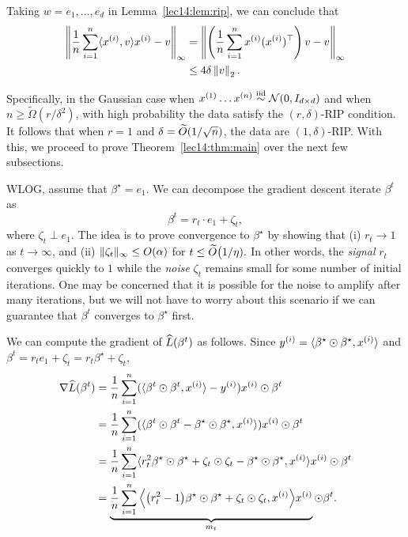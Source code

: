 \begin{corollary}\label{lec14:cor:rip}
    Taking $w = e_1, \dots, e_d$ in Lemma~\ref{lec14:lem:rip}, we can conclude that
    \begin{align}
        \Norm{ \frac{1}{n} \sum_{i=1}^n \langle x^{(i)}, v\rangle x^{(i)} - v }_\infty &= \Norm{ \l(\frac{1}{n} \sum_{i=1}^n x^{(i)}(x^{(i)})^\top \r)v - v }_\infty \\
        &\leq 4\delta \Norm{v}_2.
    \end{align}
\end{corollary}

Specifically, in the Gaussian case when $x^{(1)} \ldots x^{(n)} \iid \mathcal{N}(0, I_{d\times d})$ and when $n\geq \widetilde{\Omega}(r/\delta^2)$, with high probability the data satisfy the $(r, \delta)$-RIP condition. It follows that when $r=1$ and $\delta = \tilO(1/\sqrt{n})$, the data are $(1, \delta)$-RIP. With this, we proceed to prove Theorem~\ref{lec14:thm:main} over the next few subsections.


WLOG, assume that $\beta^\star = e_{1}.$ We can decompose the gradient descent iterate $\beta^{t}$ as
\begin{equation}
    \beta^{t} = r_{t} \cdot e_{1} + \zeta_{t},
\end{equation}
where $\zeta_t \perp e_1$. The idea is to prove convergence to $\beta^\star$ by showing that (i) $r_{t} \rightarrow 1$ as $t \rightarrow \infty$, and (ii) $\norm{\zeta_{t}}_{\infty} \leq O(\alpha)$ for $t \leq \tilO\big(1/\eta).$ In other words, the \textit{signal} $r_{t}$ converges quickly to $1$ while the \textit{noise} $\zeta_t$ remains small for some number of initial iterations. One may be concerned that it is possible for the noise to amplify after many iterations, but we will not have to worry about this scenario if we can guarantee that $\beta^{t}$ converges to $\beta^\star$ first.

We can compute the gradient of $\empLt$ as follows. Since $y\sp{i} = \langle \beta^\star \odot \beta^\star, x\sp{i} \rangle$ and $\beta^{t} = r_{t}e_{1} + \zeta_{t} = r_{t}\beta^\star + \zeta_{t}$,
\begin{align}
    \nabla \empLt &= \frac{1}{n} \sum_{i=1}^{n} (\langle \beta^{t} \odot \beta^{t}, x\sp{i} \rangle - y\sp{i} ) x\sp{i} \odot \beta^{t} \\
    &= \frac{1}{n} \sum_{i=1}^{n} ( \langle \beta^{t} \odot \beta^{t} - \beta^\star \odot \beta^\star, x\sp{i} \rangle ) x\sp{i} \odot \beta^{t} \\
    &= \frac{1}{n} \sum_{i=1}^{n} \langle r_{t}^{2} \beta^\star \odot \beta^\star + \zeta_{t} \odot \zeta_{t} - \beta^\star \odot \beta^\star, x\sp{i}  \rangle x\sp{i} \odot \beta^{t} \\
    &= \underbrace{\frac{1}{n} \sum_{i=1}^{n} \Big\langle \big(r_{t}^{2} - 1\big) \beta^\star \odot \beta^\star + \zeta_{t} \odot \zeta_{t}, x\sp{i}  \Big\rangle x\sp{i}}_{m_t} \odot \beta^{t}.
\end{align}

